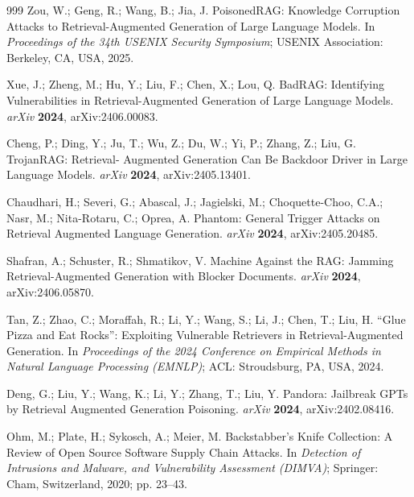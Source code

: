 \begin{thebibliography}{999}
Zou, W.; Geng, R.; Wang, B.; Jia, J. PoisonedRAG: Knowledge Corruption Attacks to
Retrieval-Augmented Generation of Large Language Models. In \textit{Proceedings of the 34th
USENIX Security Symposium}; USENIX Association: Berkeley, CA, USA, 2025.

Xue, J.; Zheng, M.; Hu, Y.; Liu, F.; Chen, X.; Lou, Q. BadRAG: Identifying Vulnerabilities in
Retrieval-Augmented Generation of Large Language Models. \textit{arXiv} \textbf{2024},
arXiv:2406.00083.

Cheng, P.; Ding, Y.; Ju, T.; Wu, Z.; Du, W.; Yi, P.; Zhang, Z.; Liu, G. TrojanRAG: Retrieval-
Augmented Generation Can Be Backdoor Driver in Large Language Models. \textit{arXiv}
\textbf{2024}, arXiv:2405.13401.

Chaudhari, H.; Severi, G.; Abascal, J.; Jagielski, M.; Choquette-Choo, C.A.; Nasr, M.;
Nita-Rotaru, C.; Oprea, A. Phantom: General Trigger Attacks on Retrieval Augmented Language
Generation. \textit{arXiv} \textbf{2024}, arXiv:2405.20485.

Shafran, A.; Schuster, R.; Shmatikov, V. Machine Against the RAG: Jamming Retrieval-Augmented
Generation with Blocker Documents. \textit{arXiv} \textbf{2024}, arXiv:2406.05870.

Tan, Z.; Zhao, C.; Moraffah, R.; Li, Y.; Wang, S.; Li, J.; Chen, T.; Liu, H. ``Glue Pizza and
Eat Rocks'': Exploiting Vulnerable Retrievers in Retrieval-Augmented Generation. In
\textit{Proceedings of the 2024 Conference on Empirical Methods in Natural Language Processing
(EMNLP)}; ACL: Stroudsburg, PA, USA, 2024.

Deng, G.; Liu, Y.; Wang, K.; Li, Y.; Zhang, T.; Liu, Y. Pandora: Jailbreak GPTs by Retrieval
Augmented Generation Poisoning. \textit{arXiv} \textbf{2024}, arXiv:2402.08416.

Ohm, M.; Plate, H.; Sykosch, A.; Meier, M. Backstabber's Knife Collection: A Review of Open
Source Software Supply Chain Attacks. In \textit{Detection of Intrusions and Malware, and
Vulnerability Assessment (DIMVA)}; Springer: Cham, Switzerland, 2020; pp. 23--43.



\end{thebibliography}

